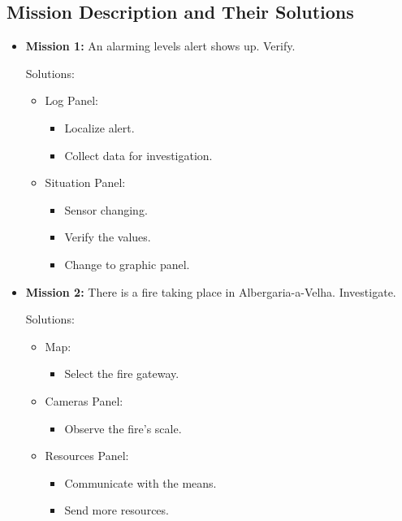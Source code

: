 \subsection{Mission Description and Their Solutions}
    \begin{itemize}
        \item \textbf{Mission 1:} An alarming levels 
        alert shows up. Verify. \par 
        Solutions:
        \begin{itemize}
            \item Log Panel:
            \begin{itemize}
                \item Localize alert.
                \item Collect data for investigation.
            \end{itemize}
            \item Situation Panel: 
            \begin{itemize}
                \item Sensor changing.
                \item Verify the values. 
                \item Change to graphic panel.
            \end{itemize}
        \end{itemize}
        \item \textbf{Mission 2:} There is a fire taking place 
        in Albergaria-a-Velha. Investigate. \par 
        Solutions:
        \begin{itemize}
            \item Map:
            \begin{itemize}
                \item Select the fire gateway. 
            \end{itemize}
            \item Cameras Panel: 
            \begin{itemize}
                \item Observe the fire's scale.
            \end{itemize}
            \item Resources Panel: 
            \begin{itemize}
                \item Communicate with the means.
                \item Send more resources.
            \end{itemize}
        \end{itemize}
    \end{itemize}

